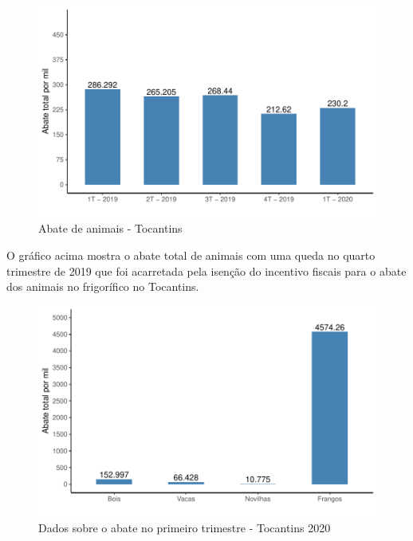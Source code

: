 \begin{figure}[h]
	\caption{Abate de animais - Tocantins}
	\includegraphics[width=\linewidth]{fig/Abate de animais.pdf}
\end{figure}

\par O gráfico acima mostra o abate total de animais com uma queda no quarto trimestre de 2019 que foi acarretada pela isenção do incentivo fiscais para o abate dos animais no frigorífico no Tocantins. 

\begin{figure}[h]
	\caption{Dados sobre o abate no primeiro trimestre - Tocantins 2020}
	\includegraphics[width=\linewidth]{fig/Abate 1T.pdf}
\end{figure}

